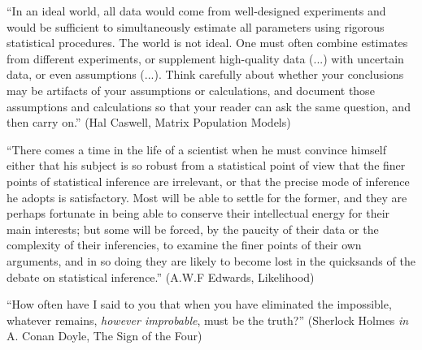 \documentclass[12pt,a4paper]{article}
\begin{document}
``In an ideal world, all data would come from well-designed experiments
and would be sufficient to simultaneously estimate all parameters using rigorous
statistical procedures. The world is not ideal. One must often combine estimates
from different experiments, or supplement high-quality data (...) with uncertain
data, or even assumptions (...). Think carefully about whether your conclusions
may be artifacts of your assumptions or calculations, and document those assumptions
and calculations so that your reader can ask the same question, and then carry on.''
(Hal Caswell, Matrix Population Models)

``There comes a time in the life of a scientist when he must convince himself
either that his subject is so robust from a statistical point of view that
the finer points of statistical inference are irrelevant, or that the precise
mode of inference he adopts is satisfactory. Most will be able to settle for
the former, and they are perhaps fortunate in being able to conserve their
intellectual energy for their main interests; but some will be forced, by the
paucity of their data or the complexity of their inferencies, to examine
the finer points of their own arguments, and in so doing they are likely
to become lost in the quicksands of the debate on statistical inference.''
(A.W.F Edwards, Likelihood)

``How often have I said to you that when you have eliminated the impossible,
whatever remains, {\em however improbable}, must be the truth?''
(Sherlock Holmes {\em in} A. Conan Doyle, The Sign of the Four)
\end{document}
